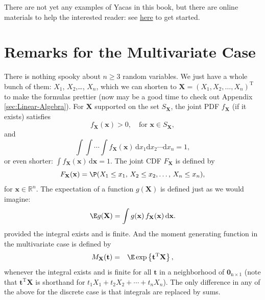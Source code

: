 \documentclass[captions=tableheading]{scrbook}
\begin{document}
There are not yet any examples of Yacas in this book, but there are online materials to help the interested reader: see \href{http://code.google.com/p/ryacas/}{here} to get started.
\section{Remarks for the Multivariate Case}
\label{sec-7-8}

\label{sec:Remarks-for-the-Multivariate}

There is nothing spooky about \(n\geq3\) random variables. We just have a whole bunch of them: \(X_{1}\), \(X_{2}\),\ldots{}, \(X_{n}\), which we can shorten to \(\mathbf{X}=(X_{1},X_{2},\ldots,X_{n})^{\mathrm{T}}\) to make the formulas prettier (now may be a good time to check out Appendix \ref{sec:Linear-Algebra}). For \(\mathbf{X}\) supported on the set \(S_{\mathbf{X}}\), the joint PDF \(f_{\mathbf{X}}\) (if it exists) satisfies
\begin{equation}
f_{\mathbf{X}}(\mathbf{x})>0,\quad\mbox{for }\mathbf{x}\in S_{\mathbf{X}},
\end{equation}
and
\begin{equation}
\int\!\!\!\int\cdots\int f_{\mathbf{X}}(\mathbf{x})\,\mathrm{d} x_{1}\mathrm{d} x_{2}\cdots\mathrm{d} x_{n}=1,
\end{equation}
or even shorter: \(\int f_{\mathbf{X}}(\mathbf{x})\,\mathrm{d}\mathbf{x}=1\). The joint CDF \(F_{\mathbf{X}}\) is defined by 
\begin{equation}
F_{\mathbf{X}}(\mathbf{x})=\P(X_{1}\leq x_{1},\, X_{2}\leq x_{2},\ldots,\, X_{n}\leq x_{n}),
\end{equation}
for \(\mathbf{x}\in\mathbb{R}^{n}\). The expectation of a function \(g(\mathbf{X})\) is defined just as we would imagine:
\begin{equation}
\E g(\mathbf{X})=\int g(\mathbf{x})\, f_{\mathbf{X}}(\mathbf{x})\,\mathrm{d}\mathbf{x}.
\end{equation}
provided the integral exists and is finite. And the moment generating function in the multivariate case is defined by
\begin{eqnarray} 
M_{\mathbf{X}}(\mathbf{t}) & = & \E\exp\left\{ \mathbf{t}^{\mathrm{T}}\mathbf{X}\right\},
\end{eqnarray}
whenever the integral exists and is finite for all \(\mathbf{t}\) in a neighborhood of \(\mathbf{0}_{\mathrm{n}\times1}\) (note that \(\mathbf{t}^{\mathrm{T}}\mathbf{X}\) is shorthand for \(t_{1}X_{1}+t_{2}X_{2}+\cdots+t_{n}X_{n}\)). The only difference in any of the above for the discrete case is that integrals are replaced by sums. 
\end{document}
